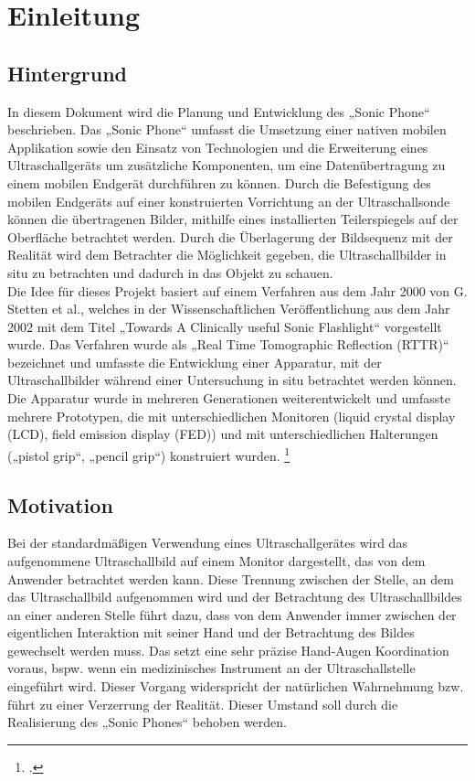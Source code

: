 \chapter{Einleitung}\label{chap:Einleitung}
\section{Hintergrund}
In diesem Dokument wird die Planung und Entwicklung des „Sonic Phone“ beschrieben. Das „Sonic Phone“ umfasst die Umsetzung einer nativen mobilen Applikation sowie den Einsatz von Technologien und die Erweiterung eines Ultraschallgeräts um zusätzliche Komponenten, um eine Datenübertragung zu einem mobilen Endgerät durchführen zu können. Durch die Befestigung des mobilen Endgeräts auf einer konstruierten Vorrichtung an der Ultraschallsonde können die übertragenen Bilder, mithilfe eines installierten Teilerspiegels auf der Oberfläche betrachtet werden. Durch die Überlagerung der Bildsequenz mit der Realität wird dem Betrachter die Möglichkeit gegeben, die Ultraschallbilder in situ zu betrachten und dadurch in das Objekt zu schauen.\\
Die Idee für dieses Projekt basiert auf einem Verfahren aus dem Jahr 2000 von G. Stetten et al., welches in der Wissenschaftlichen Veröffentlichung aus dem Jahr 2002 mit dem Titel „Towards A Clinically useful Sonic Flashlight“ vorgestellt wurde. Das Verfahren wurde als „Real Time Tomographic Reflection (RTTR)“ bezeichnet und umfasste die Entwicklung einer Apparatur, mit der Ultraschallbilder während einer Untersuchung in situ  betrachtet werden können. Die Apparatur wurde in mehreren Generationen weiterentwickelt und umfasste mehrere Prototypen, die mit unterschiedlichen Monitoren (liquid crystal display (LCD), field emission display (FED)) und mit unterschiedlichen Halterungen („pistol grip“, „pencil grip“) konstruiert wurden. \footcite{SonicFlashlight} 

\section{Motivation}
Bei der standardmäßigen Verwendung eines Ultraschallgerätes wird das aufgenommene Ultraschallbild auf einem Monitor dargestellt, das von dem Anwender betrachtet werden kann. Diese Trennung zwischen der Stelle, an dem das Ultraschallbild aufgenommen wird und der Betrachtung des Ultraschallbildes an einer anderen Stelle führt dazu, dass von dem Anwender immer zwischen der eigentlichen Interaktion mit seiner Hand und der Betrachtung des Bildes gewechselt werden muss. Das setzt eine sehr präzise Hand-Augen Koordination voraus, bspw. wenn ein medizinisches Instrument an der Ultraschallstelle eingeführt wird. Dieser Vorgang widerspricht der natürlichen Wahrnehmung bzw. führt zu einer Verzerrung der Realität. Dieser Umstand soll durch die Realisierung des „Sonic Phones“ behoben werden.
